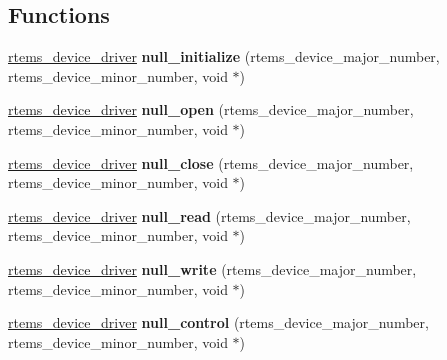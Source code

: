 \subsection*{Functions}
\begin{DoxyCompactItemize}
\item 
\mbox{\label{group__libmisc__devnull_gacbb3942b1823e46f786d5f38da2eb6cc}} 
\mbox{\hyperlink{group__ClassicStatus_ga545d41846817eaba6143d52ee4d9e9fe}{rtems\+\_\+device\+\_\+driver}} {\bfseries null\+\_\+initialize} (rtems\+\_\+device\+\_\+major\+\_\+number, rtems\+\_\+device\+\_\+minor\+\_\+number, void $\ast$)
\item 
\mbox{\label{group__libmisc__devnull_ga1319a1f93213fbdbb0b49fdcfad84dd8}} 
\mbox{\hyperlink{group__ClassicStatus_ga545d41846817eaba6143d52ee4d9e9fe}{rtems\+\_\+device\+\_\+driver}} {\bfseries null\+\_\+open} (rtems\+\_\+device\+\_\+major\+\_\+number, rtems\+\_\+device\+\_\+minor\+\_\+number, void $\ast$)
\item 
\mbox{\label{group__libmisc__devnull_ga0b53a04abf873b859f84da9530fd5a8b}} 
\mbox{\hyperlink{group__ClassicStatus_ga545d41846817eaba6143d52ee4d9e9fe}{rtems\+\_\+device\+\_\+driver}} {\bfseries null\+\_\+close} (rtems\+\_\+device\+\_\+major\+\_\+number, rtems\+\_\+device\+\_\+minor\+\_\+number, void $\ast$)
\item 
\mbox{\label{group__libmisc__devnull_ga694cb2a8b102f7b75ac59978b42e52a0}} 
\mbox{\hyperlink{group__ClassicStatus_ga545d41846817eaba6143d52ee4d9e9fe}{rtems\+\_\+device\+\_\+driver}} {\bfseries null\+\_\+read} (rtems\+\_\+device\+\_\+major\+\_\+number, rtems\+\_\+device\+\_\+minor\+\_\+number, void $\ast$)
\item 
\mbox{\label{group__libmisc__devnull_gadde285f1498c77de0ef04ebce0c3e405}} 
\mbox{\hyperlink{group__ClassicStatus_ga545d41846817eaba6143d52ee4d9e9fe}{rtems\+\_\+device\+\_\+driver}} {\bfseries null\+\_\+write} (rtems\+\_\+device\+\_\+major\+\_\+number, rtems\+\_\+device\+\_\+minor\+\_\+number, void $\ast$)
\item 
\mbox{\label{group__libmisc__devnull_gaa3223bc73946cb82137d8a0c598c1756}} 
\mbox{\hyperlink{group__ClassicStatus_ga545d41846817eaba6143d52ee4d9e9fe}{rtems\+\_\+device\+\_\+driver}} {\bfseries null\+\_\+control} (rtems\+\_\+device\+\_\+major\+\_\+number, rtems\+\_\+device\+\_\+minor\+\_\+number, void $\ast$)
\end{DoxyCompactItemize}


